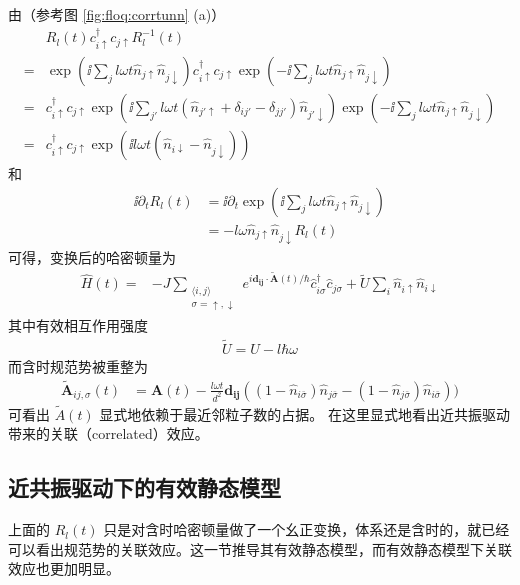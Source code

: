 由（参考图 \ref{fig:floq:corrtunn} (a)）
\begin{align}
& R_l(t)c_{i\uparrow}^{\dagger}c_{j\uparrow}R_l^{-1}(t)\\
=& \exp(\ii\sum_{j}l\omega t\hat{n}_{j\uparrow}\hat{n}_{j\downarrow})
c_{i\uparrow}^{\dagger}c_{j\uparrow}\exp(-\ii\sum_{j}l\omega t\hat{n}_{j\uparrow}\hat{n}_{j\downarrow})\\
=& c_{i\uparrow}^{\dagger}c_{j\uparrow}\exp(\ii\sum_{j'}l\omega t(\hat{n}_{j'\uparrow}+\delta_{ij'}-\delta_{jj'})\hat{n}_{j'\downarrow})\exp(-\ii\sum_{j}l\omega t\hat{n}_{j\uparrow}\hat{n}_{j\downarrow})\\
=& c_{i\uparrow}^{\dagger}c_{j\uparrow} \exp(\ii l\omega t(\hat{n}_{i\downarrow}-\hat{n}_{j\downarrow})) 
\end{align}
和
\begin{align}
\ii\partial_tR_l(t) &= \ii\partial_t \exp(\ii\sum_{j}l\omega t\hat{n}_{j\uparrow}\hat{n}_{j\downarrow}) \\
&= -l \omega \hat{n}_{j\uparrow}\hat{n}_{j\downarrow} R_l(t) 
\end{align}
可得，变换后的哈密顿量为
\begin{align}
\hat{H}(t) =& -J \sum_{\substack{\langle i,j\rangle \\ \sigma = \uparrow,\downarrow}}e^{i\mathbf{d_{ij}}\cdot \tilde{\mathbf{A}}(t)/\hbar} \hat{c}_{i\sigma}^{\dagger}\hat{c}_{j\sigma}+ \tilde{U}\sum_i\hat{n}_{i\uparrow}\hat{n}_{i\downarrow} \label{eq:htt}
\end{align}
其中有效相互作用强度
\begin{align}
\tilde{U}=U-l\hbar\omega
\end{align}
而含时规范势被重整为
\begin{align}
\tilde{\mathbf{A}}_{ij,\sigma}(t)&=\mathbf{A}(t)-\frac{l\omega t}{d^2} \mathbf{d_{ij}}((1-\hat n_{i\bar\sigma})\hat n_{j\bar\sigma}-(1-\hat n_{j\bar\sigma})\hat n_{i\bar\sigma}))
\end{align}
可看出 $\tilde{A}(t)$ 显式地依赖于最近邻粒子数的占据。
在这里显式地看出近共振驱动带来的关联（correlated）效应。


\subsection{近共振驱动下的有效静态模型}
上面的 $R_l(t)$ 只是对含时哈密顿量做了一个幺正变换，体系还是含时的，就已经可以看出规范势的关联效应。这一节推导其有效静态模型，而有效静态模型下关联效应也更加明显。

